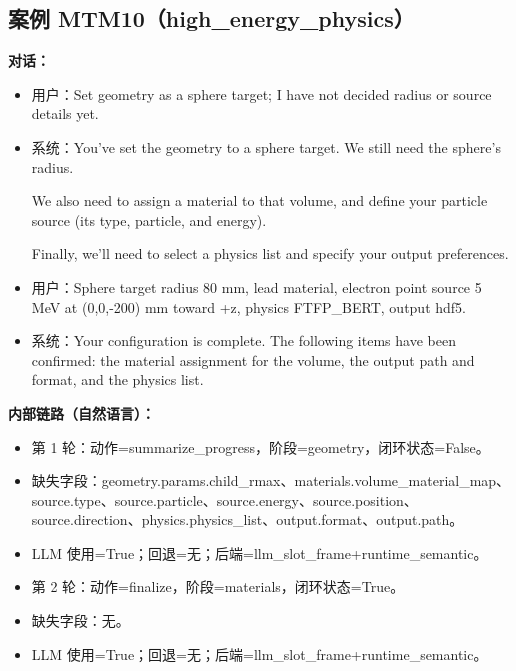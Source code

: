 \documentclass[11pt]{ctexart}
\begin{document}
\subsection{案例 MTM10（high\_energy\_physics）}
\textbf{对话：}
\begin{itemize}
\item 用户：Set geometry as a sphere target; I have not decided radius or source details yet.
\item 系统：You've set the geometry to a sphere target. We still need the sphere's radius.

We also need to assign a material to that volume, and define your particle source (its type, particle, and energy).

Finally, we'll need to select a physics list and specify your output preferences.
\item 用户：Sphere target radius 80 mm, lead material, electron point source 5 MeV at (0,0,-200) mm toward +z, physics FTFP\_BERT, output hdf5.
\item 系统：Your configuration is complete. The following items have been confirmed: the material assignment for the volume, the output path and format, and the physics list.
\end{itemize}
\textbf{内部链路（自然语言）：}
\begin{itemize}
\item 第 1 轮：动作=summarize\_progress，阶段=geometry，闭环状态=False。
\item 缺失字段：geometry.params.child\_rmax、materials.volume\_material\_map、source.type、source.particle、source.energy、source.position、source.direction、physics.physics\_list、output.format、output.path。
\item LLM 使用=True；回退=无；后端=llm\_slot\_frame+runtime\_semantic。
\item 第 2 轮：动作=finalize，阶段=materials，闭环状态=True。
\item 缺失字段：无。
\item LLM 使用=True；回退=无；后端=llm\_slot\_frame+runtime\_semantic。
\end{itemize}
\end{document}

